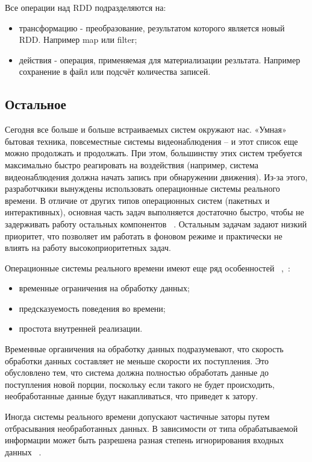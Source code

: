 Все операции над RDD подразделяются на:
\begin{itemize}
    \item трансформацию - преобразование, результатом которого является новый RDD. Например map или filter;
    \item действия - операция, применяемая для материализации резльтата. Например сохранение в файл или подсчёт количества записей.
\end{itemize}

\subsection{Остальное}


Сегодня все больше и больше встраиваемых систем окружают нас. «Умная» бытовая
техника, повсеместные системы видеонаблюдения -- и этот список еще можно
продолжать и продолжать. При этом, большинству этих систем требуется максимально
быстро реагировать на воздействия (например, система видеонаблюдения должна начать
запись при обнаружении движения).
Из-за этого, разработчкики вынуждены использовать операционные системы
реального времени. В отличие от других типов операционных систем (пакетных и
интерактивных), основная часть задач выполняется достаточно быстро, чтобы
не задерживать работу остальных компонентов ~\cite{tanenbaum_modern_os_2015_ru}.
Остальным задачам задают низкий приоритет, что позволяет им работать в фоновом
режиме и практически не влиять на работу высокоприоритетных задач.


Операционные системы реального времени имеют еще ряд особенностей
~\cite{tanenbaum_modern_os_2015_ru},~\cite{rtos_valvano}:
\begin{itemize}
    \item временные ограничения на обработку данных;
    \item предсказуемость поведения во времени;
    \item простота внутренней реализации.
\end{itemize}

Временные органичения на обработку данных подразумевают, что скорость обработки
данных составляет не меньше скорости их поступления. Это обусловлено тем, что
система должна полностью обработать данные до поступления новой порции, поскольку
если такого не будет происходить, необработанные данные будут накапливаться,
что приведет к затору.

Иногда системы реального времени допускают частичные заторы путем отбрасывания
необработанных данных. В зависимости от типа обрабатываемой информации
может быть разрешена разная степень игнорирования входных данных
~\cite{tanenbaum_modern_os_2015_ru}.

